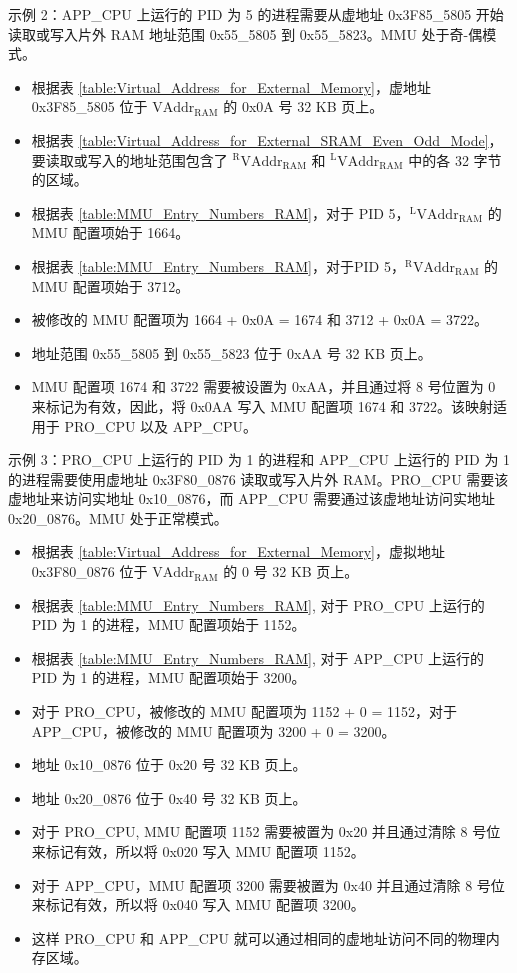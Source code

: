 示例 2：APP\_CPU 上运行的 PID 为 5 的进程需要从虚地址 0x3F85\_5805 开始读取或写入片外 RAM 地址范围 0x55\_5805 到 0x55\_5823。MMU 处于奇-偶模式。
\begin{itemize}
\itemsep-0.5em
\item 根据表 \ref{table:Virtual_Address_for_External_Memory}，虚地址 0x3F85\_5805 位于 $\mathrm{VAddr}_{\mathrm{RAM}}$ 的 0x0A 号 32 KB 页上。
\item 根据表 \ref{table:Virtual_Address_for_External_SRAM_Even_Odd_Mode}，要读取或写入的地址范围包含了 $^{\mathrm{R}}\mathrm{VAddr}_{\mathrm{RAM}}$ 和 $^{\mathrm{L}}\mathrm{VAddr}_{\mathrm{RAM}}$ 中的各 32 字节的区域。
\item 根据表 \ref{table:MMU_Entry_Numbers_RAM}，对于 PID 5，$^{\mathrm{L}}\mathrm{VAddr}_{\mathrm{RAM}}$ 的 MMU 配置项始于 1664。
\item 根据表 \ref{table:MMU_Entry_Numbers_RAM}，对于PID 5，$^{\mathrm{R}}\mathrm{VAddr}_{\mathrm{RAM}}$ 的 MMU 配置项始于 3712。
\item 被修改的 MMU 配置项为 1664 + 0x0A = 1674 和 3712 + 0x0A = 3722。
\item 地址范围 0x55\_5805 到 0x55\_5823 位于 0xAA 号 32 KB 页上。
\item
MMU 配置项 1674 和 3722 需要被设置为 0xAA，并且通过将 8 号位置为 0 来标记为有效，因此，将 0x0AA 写入 MMU 配置项 1674 和 3722。该映射适用于 PRO\_CPU 以及 APP\_CPU。
\end{itemize}

示例 3：PRO\_CPU 上运行的 PID 为 1 的进程和 APP\_CPU 上运行的 PID 为 1 的进程需要使用虚地址 0x3F80\_0876 读取或写入片外 RAM。PRO\_CPU 需要该虚地址来访问实地址 0x10\_0876，而 APP\_CPU 需要通过该虚地址访问实地址 0x20\_0876。MMU 处于正常模式。
\begin{itemize}
\itemsep-0.5em
\item 根据表 \ref{table:Virtual_Address_for_External_Memory}，虚拟地址 0x3F80\_0876 位于 $\mathrm{VAddr}_{\mathrm{RAM}}$ 的 0 号 32 KB 页上。
\item 根据表 \ref{table:MMU_Entry_Numbers_RAM}, 对于 PRO\_CPU 上运行的 PID 为 1 的进程，MMU 配置项始于 1152。
\item 根据表 \ref{table:MMU_Entry_Numbers_RAM}, 对于 APP\_CPU 上运行的 PID 为 1 的进程，MMU 配置项始于 3200。
\item 对于 PRO\_CPU，被修改的 MMU 配置项为 1152 + 0 = 1152，对于 APP\_CPU，被修改的 MMU 配置项为 3200 + 0 = 3200。
\item 地址 0x10\_0876 位于 0x20 号 32 KB 页上。
\item 地址 0x20\_0876 位于 0x40 号 32 KB 页上。
\item 对于 PRO\_CPU, MMU 配置项 1152 需要被置为 0x20 并且通过清除 8 号位来标记有效，所以将 0x020 写入 MMU 配置项 1152。
\item 对于 APP\_CPU，MMU 配置项 3200 需要被置为 0x40 并且通过清除 8 号位来标记有效，所以将 0x040 写入 MMU 配置项 3200。
\item 这样 PRO\_CPU 和 APP\_CPU 就可以通过相同的虚地址访问不同的物理内存区域。
\end{itemize}
